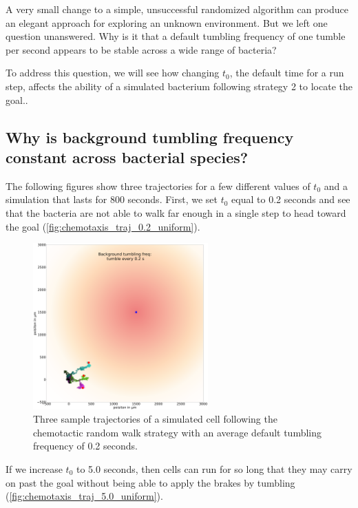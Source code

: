 A very small change to a simple, unsuccessful randomized algorithm can produce an elegant approach for exploring an unknown environment. But we left one question unanswered. Why is it that a default tumbling frequency of one tumble per second appears to be stable across a wide range of bacteria?

To address this question, we will see how changing $t_0$, the default time for a run step, affects the ability of a simulated bacterium following strategy 2 to locate the goal..


\FloatBarrier
{}
\subsection{Why is background tumbling frequency constant across bacterial species?}


The following figures show three trajectories for a few different values of $t_0$ and a simulation that lasts for 800 seconds. First, we set $t_0$ equal to 0.2 seconds and see that the bacteria are not able to walk far enough in a single step to head toward the goal (\autoref{fig:chemotaxis_traj_0.2_uniform}).

\begin{figure}[h]
\centering
\mySfFamily
\includegraphics[width = 0.6\textwidth]{../images/chemotaxis_traj_0.2_uniform.png}
\caption{Three sample trajectories of a simulated cell following the chemotactic random walk strategy with an average default tumbling frequency of 0.2 seconds.}
\label{fig:chemotaxis_traj_0.2_uniform}
\end{figure}

If we increase $t_0$ to 5.0 seconds, then cells can run for so long that they may carry on past the goal without being able to apply the brakes by tumbling (\autoref{fig:chemotaxis_traj_5.0_uniform}).

